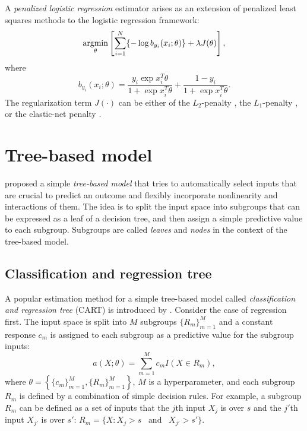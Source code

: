 \documentclass[12pt]{article}
\newcommand{\argmin}{\mathop{\rm argmin}\limits}
\begin{document}
A {\it penalized logistic regression} estimator arises as an extension of penalized least squares methods to the logistic regression framework:
\begin{equation*}
\argmin_{\theta} \left[\sum_{i=1}^{N} \{-\log b_{y_i}(x_i;\theta)\} + \lambda J(\theta) \right],
\end{equation*}
where
\begin{equation*}
b_{y_i}(x_i;\theta) = \frac{y_i \exp{x_i^T \theta}}{1 + \exp{x_i^T \theta}} + \frac{1-y_i}{1 + \exp{x_i^T \theta}}.
\end{equation*}
The regularization term $J(\cdot)$ can be either of the $L_2$-penalty \parencite{Zhu2004}, the $L_1$-penalty \parencite{Shevade2003}, or the elastic-net penalty \parencite{Waldron2011}.


\section{Tree-based model}

\textcite{Morgan1963} proposed a simple {\it tree-based model} that tries to automatically select inputs that are crucial to predict an outcome and flexibly incorporate nonlinearity and interactions of them. The idea is to split the input space into subgroups that can be expressed as a leaf of a decision tree, and then assign a simple predictive value to each subgroup. Subgroups are called {\it leaves} and {\it nodes} in the context of the tree-based model.

\subsection{Classification and regression tree}

A popular estimation method for a simple tree-based model called {\it classification and regression tree} (CART) is introduced by \textcite{Breiman1984}. Consider the case of regression first. The input space is split into $M$ subgroups $\{R_m\}_{m=1}^M$ and a constant response $c_m$ is assigned to each subgroup as a predictive value for the subgroup inputs:
\begin{equation*}
a(X;\theta) = \sum_{m=1}^M c_m I(X \in R_m),
\end{equation*}
where $\theta = \left\{\{c_m\}_{m=1}^M, \{R_m\}_{m=1}^M \right\}$, $M$ is a hyperparameter, and each subgroup $R_m$ is defined by a combination of simple decision rules. For example, a subgroup $R_m$ can be defined as a set of inputs that the $j$th input $X_j$ is over $s$ and the $j'$th input $X_{j'}$ is over $s'$: $R_m = \{X:X_j > s \hspace{10pt} \text{and} \hspace{10pt} X_{j'} > s'\}$.
\end{document}
